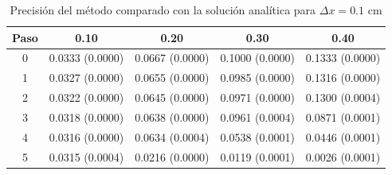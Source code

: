 \documentclass[11pt]{article}
\begin{document}
\begin{table}
\center
\begin{tabular}{ c c c c c }
\hline
Paso & 0.10 & 0.20 & 0.30 & 0.40 \\
\hline
\hline
0 & 0.0333 (0.0000) & 0.0667 (0.0000) & 0.1000 (0.0000) & 0.1333 (0.0000) \\
1 & 0.0327 (0.0000) & 0.0655 (0.0000) & 0.0985 (0.0000) & 0.1316 (0.0000) \\
2 & 0.0322 (0.0000) & 0.0645 (0.0000) & 0.0971 (0.0000) & 0.1300 (0.0004) \\
3 & 0.0318 (0.0000) & 0.0638 (0.0000) & 0.0961 (0.0004) & 0.0871 (0.0001) \\
4 & 0.0316 (0.0000) & 0.0634 (0.0004) & 0.0538 (0.0001) & 0.0446 (0.0001) \\
5 & 0.0315 (0.0004) & 0.0216 (0.0000) & 0.0119 (0.0001) & 0.0026 (0.0001) \\
\end{tabular}
\caption{Precisión del método comparado con la solución analítica para $\Delta{x} = 0.1$ cm}
\label{tab:comparativa2}
\end{table}
\end{document}
